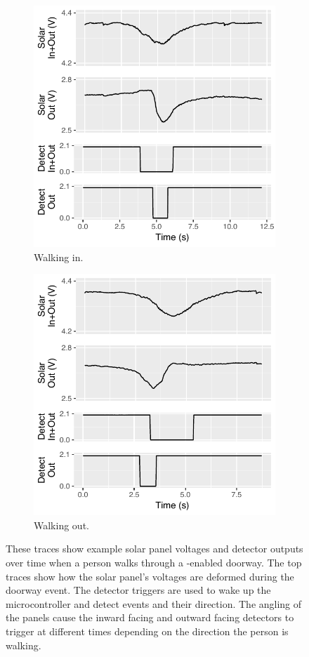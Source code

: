 \begin{figure}[t]
	\centering
	\begin{subfigure}[b]{0.45\textwidth}
		\centering
		\includegraphics[width=0.8\columnwidth]{figs/tracesin.pdf}
		\caption{Walking in.}
		\label{fig:tracesin}
	\end{subfigure}%
	\begin{subfigure}[b]{0.45\textwidth}
		\centering
		\includegraphics[width=0.8\columnwidth]{figs/tracesout.pdf}
		\caption{Walking out.}
		\label{fig:tracesout}
	\end{subfigure}
	\caption{These traces show example solar panel voltages and detector outputs over time when a person walks through a \sysname-enabled doorway. The top traces show how the solar panel's voltages are deformed during the doorway event. The detector triggers are used to wake up the microcontroller and detect events and their direction. The angling of the panels cause the inward facing and outward facing detectors to trigger at different times depending on the direction the person is walking.\label{fig:traces}}
\end{figure}

